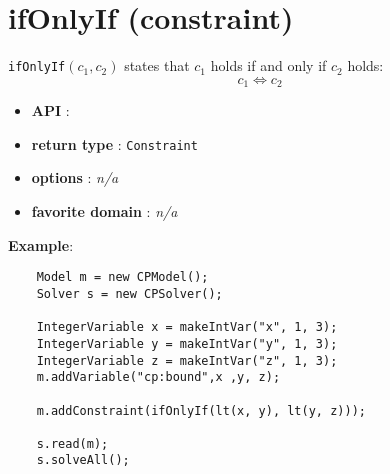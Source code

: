 \label{ifonlyif}
\hypertarget{ifonlyif}{}

\section{ifOnlyIf (constraint)}\label{ifonlyif:ifonlyifconstraint}\hypertarget{ifonlyif:ifonlyifconstraint}{}
\begin{notedef}
  \texttt{ifOnlyIf}$(c_1,c_2)$ states that $c_1$ holds if and only if $c_2$ holds:
$$c_1\iff c_2$$
\end{notedef}

\begin{itemize}
	\item \textbf{API} : 
	\item \textbf{return type} : \texttt{Constraint}
	\item \textbf{options} : \emph{n/a}
	\item \textbf{favorite domain} : \emph{n/a}
\end{itemize}

\textbf{Example}:
\begin{lstlisting}
	Model m = new CPModel();
	Solver s = new CPSolver();
	
	IntegerVariable x = makeIntVar("x", 1, 3);
	IntegerVariable y = makeIntVar("y", 1, 3);
	IntegerVariable z = makeIntVar("z", 1, 3);
	m.addVariable("cp:bound",x ,y, z);
	
	m.addConstraint(ifOnlyIf(lt(x, y), lt(y, z)));
	
	s.read(m);
	s.solveAll();
\end{lstlisting}
